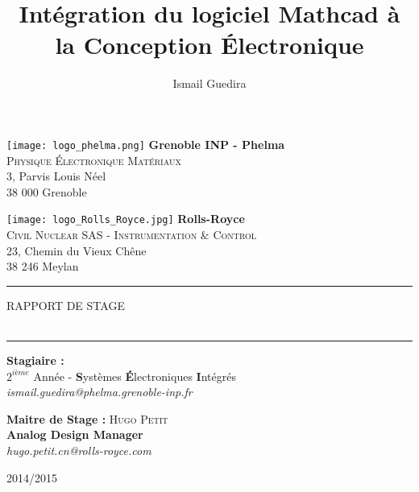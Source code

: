\documentclass[11pt,a4paper]{report}
\title{Intégration du logiciel Mathcad à la Conception Électronique}
\author{Ismail Guedira}
\begin{document}

\makeatletter
  \begin{titlepage}
  \centering
      {\texttt{[image: logo\_phelma.png]} \hfill \Large \textbf{Grenoble INP - Phelma}}\\
    \hfill \large \textsc{Physique Électronique Matériaux}\\
    \hfill  3, Parvis Louis Néel \\
	\hfill  38 000 Grenoble\\

	\hspace{3em}

    { \texttt{[image: logo\_Rolls\_Royce.jpg]} \hfill \Large \textbf{Rolls-Royce}}\\
    \hfill \large \textsc{Civil Nuclear SAS - Instrumentation \& Control }\\
	\hfill 23, Chemin du Vieux Chêne   \\
    \hfill 38 246 Meylan  \\


   \vfill

    \hrule
    \vspace{1.5em}
    	{	\LARGE \textsc{RAPPORT DE STAGE} \\
    \vspace{1.5em}
       \LARGE \textbf{\@title}} \\
    \vspace{1.5em}
    \hrule
    \vspace{3 em}
	\Large \textbf{Stagiaire :}		\hfill   \textsc{\@author} \\
                                  	\hfill   \large $2^{ième}$ Année - \textbf{S}ystèmes \textbf{É}lectroniques \textbf{I}ntégrés \\
   									\hfill   \textit{ismail.guedira@phelma.grenoble-inp.fr} \\
	\vspace{2em}

    \Large \textbf{Maitre de Stage :} 	\hfill	\Large \textsc{Hugo Petit} \\
   										\hfill	\large \textbf{Analog Design Manager} \\
   										\hfill	\textit{hugo.petit.cn@rolls-royce.com} \\


    \vfill

     {\Large \textsc{2014/2015}  \hfill \Large \textsc{\@date}} \\


  \end{titlepage}
\makeatother
\end{document}

